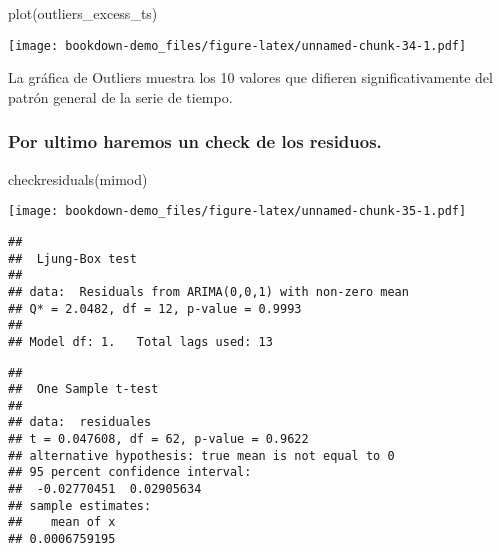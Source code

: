 \documentclass[
]{book}
\newenvironment{Shaded}{\begin{snugshade}}{\end{snugshade}}
\newcommand{\AttributeTok}[1]{\textcolor[rgb]{0.77,0.63,0.00}{#1}}
\newcommand{\DecValTok}[1]{\textcolor[rgb]{0.00,0.00,0.81}{#1}}
\newcommand{\FloatTok}[1]{\textcolor[rgb]{0.00,0.00,0.81}{#1}}
\newcommand{\FunctionTok}[1]{\textcolor[rgb]{0.00,0.00,0.00}{#1}}
\newcommand{\NormalTok}[1]{#1}
\newcommand{\OtherTok}[1]{\textcolor[rgb]{0.56,0.35,0.01}{#1}}
\newcommand{\SpecialCharTok}[1]{\textcolor[rgb]{0.00,0.00,0.00}{#1}}
\newcommand{\StringTok}[1]{\textcolor[rgb]{0.31,0.60,0.02}{#1}}
\begin{document}
\begin{Shaded}
\begin{Highlighting}[]
\FunctionTok{plot}\NormalTok{(outliers\_excess\_ts)}
\end{Highlighting}
\end{Shaded}

\texttt{[image: bookdown-demo\_files/figure-latex/unnamed-chunk-34-1.pdf]}

La gráfica de Outliers muestra los 10 valores que difieren significativamente del patrón general de la serie de tiempo.

\hypertarget{por-ultimo-haremos-un-check-de-los-residuos.}{%
\subsubsection{Por ultimo haremos un check de los residuos.}\label{por-ultimo-haremos-un-check-de-los-residuos.}}

\begin{Shaded}
\begin{Highlighting}[]
\FunctionTok{checkresiduals}\NormalTok{(mimod)}
\end{Highlighting}
\end{Shaded}

\texttt{[image: bookdown-demo\_files/figure-latex/unnamed-chunk-35-1.pdf]}

\begin{verbatim}
## 
##  Ljung-Box test
## 
## data:  Residuals from ARIMA(0,0,1) with non-zero mean
## Q* = 2.0482, df = 12, p-value = 0.9993
## 
## Model df: 1.   Total lags used: 13
\end{verbatim}

\begin{Shaded}
\end{Shaded}

\begin{verbatim}
## 
##  One Sample t-test
## 
## data:  residuales
## t = 0.047608, df = 62, p-value = 0.9622
## alternative hypothesis: true mean is not equal to 0
## 95 percent confidence interval:
##  -0.02770451  0.02905634
## sample estimates:
##    mean of x 
## 0.0006759195
\end{verbatim}
\end{document}
